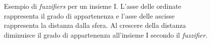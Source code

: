 \documentclass[12pt,italian]{report}
\begin{document}
\begin{figure}[h!t]
	\centering
	\caption{Esempio di \emph{fuzzifiers} per un insieme I. L'asse delle ordinate rappresenta il grado di appartenenza e l'asse delle ascisse rappresenta la distanza dalla sfera. Al crescere della distanza diminuisce il grado di appartenenza all'insieme I secondo il \emph{fuzzifier}.}
	\label{fig:fuzzifier}
\end{figure}
\end{document}
